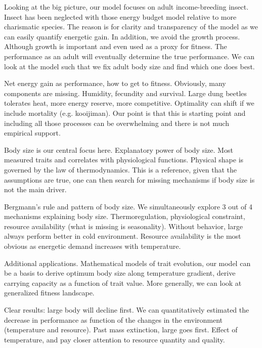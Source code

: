 Looking at the big picture, our model focuses on adult income-breeding insect.
Insect has been neglected with those energy budget model relative to more charismatic species.
The reason is for clarity and transparency of the model as we can easily quantify energetic gain.
In addition, we avoid the growth process.
Although growth is important and even used as a proxy for fitness.
The performance as an adult will eventually determine the true performance.
We can look at the model such that we fix adult body size and find which one does best. 

Net energy gain as performance, how to get to fitness.
Obviously, many components are missing.
Humidity, fecundity and survival.
Large dung beetles tolerates heat, more energy reserve, more competitive.
Optimality can shift if we include mortality (e.g. kooijiman).
Our point is that this is starting point and including all those processes can be overwhelming and there is not much empirical support.

Body size is our central focus here.
Explanatory power of body size.
Most measured traits and correlates with physiological functions.
Physical shape is governed by the law of thermodynamics.
This is a reference, given that the assumptions are true, one can then search for missing mechanisms if body size is not the main driver.

Bergmann's rule and pattern of body size.
We simultaneously explore 3 out of 4 mechanisms explaining body size.
Thermoregulation, physiological constraint, resource availability (what is missing is seasonality).
Without behavior, large always perform better in cold environment.
Resource availability is the most obvious as energetic demand increases with temperature.

Additional applications.
Mathematical models of trait evolution, our model can be a basis to derive optimum body size along temperature gradient, derive carrying capacity as a function of trait value. 
More generally, we can look at generalized fitness landscape.

Clear results: large body will decline first. 
We can quantitatively estimated the decrease in performance as function of the changes in the environment  (temperature and resource).
Past mass extinction, large goes first.
Effect of temperature, and pay closer attention to resource quantity and quality.


%


